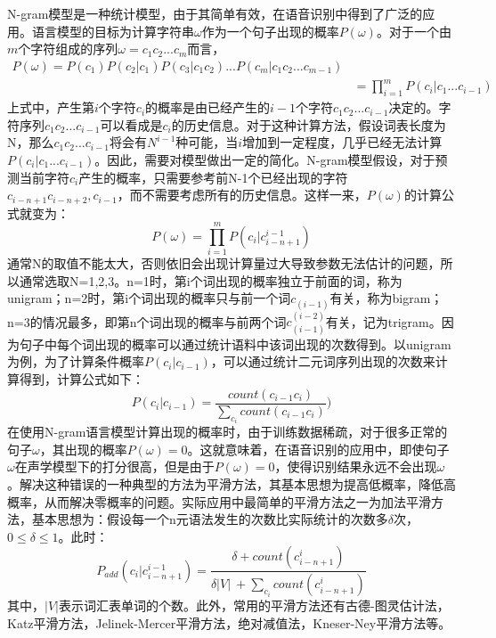 N-gram模型是一种统计模型，由于其简单有效，在语音识别中得到了广泛的应用。语言模型的目标为计算字符串$\omega$作为一个句子出现的概率$P(\omega)$。对于一个由$m$个字符组成的序列$\omega=c_1 c_2...c_m$而言，
\begin{eqnarray}
  P(\omega) = P(c_1)P(c_2|c_1)P(c_3|c_1 c_2)...P(c_m|c_1 c_2...c_{m-1}) \\
          & = \prod\limits_{i=1}^m P(c_i|c_1...c_{i-1})
\end{eqnarray}
上式中，产生第$i$个字符$c_i$的概率是由已经产生的$i-1$个字符$c_1 c_2...c_{i-1}$决定的。字符序列$c_1 c_2...c_{i-1}$可以看成是$c_i$的历史信息。对于这种计算方法，假设词表长度为N，那么$c_1 c_2...c_{i-1}$将会有$N^{i-1}$种可能，当$i$增加到一定程度，几乎已经无法计算$P(c_i|c_1...c_{i-1})$。因此，需要对模型做出一定的简化。N-gram模型假设，对于预测当前字符$c_i$产生的概率，只需要参考前N-1个已经出现的字符$c_{i-n+1} c_{i-n+2}, c_{i-1}$，而不需要考虑所有的历史信息。这样一来，$P(\omega)$的计算公式就变为：
\begin{equation}P(\omega) = \prod\limits_{i=1}^m P(c_i|c_{i-n+1}^{i-1})\end{equation}
通常N的取值不能太大，否则依旧会出现计算量过大导致参数无法估计的问题，所以通常选取N=1,2,3。n=1时，第i个词出现的概率独立于前面的词，称为unigram；n=2时，第i个词出现的概率只与前一个词$c_(i-1)$有关，称为bigram；n=3的情况最多，即第n个词出现的概率与前两个词$c_(i-1)^(i-2)$有关，记为trigram。因为句子中每个词出现的概率可以通过统计语料中该词出现的次数得到。以unigram为例，为了计算条件概率$P(c_i|c_{i-1})$，可以通过统计二元词序列出现的次数来计算得到，计算公式如下：
\begin{equation}P(c_i|c_{i-1})=\frac{count(c_{i-1} c_i)}{\sum\limits_{c_i} count(c_{i-1} c_i)})\end{equation}
在使用N-gram语言模型计算出现的概率时，由于训练数据稀疏，对于很多正常的句子$\omega$，其出现的概率$P(\omega)=0$。这就意味着，在语音识别的应用中，即使句子$\omega$在声学模型下的打分很高，但是由于$P(\omega)=0$，使得识别结果永远不会出现$\omega$。解决这种错误的一种典型的方法为平滑方法，其基本思想为提高低概率，降低高概率，从而解决零概率的问题。实际应用中最简单的平滑方法之一为加法平滑方法，基本思想为：假设每一个n元语法发生的次数比实际统计的次数多$\delta$次，$0\leqslant \delta \leqslant 1$。此时：
\begin{equation}P_{add}(c_i|c_{i-n+1}^{i-1})=\frac{\delta+count(c_{i-n+1}^{i})}{\delta \lvert V\rvert\ + \sum\limits_{c_i} count(c_{i-n+1}^i)}\end{equation}
其中，$\lvert V\rvert$表示词汇表单词的个数。此外，常用的平滑方法还有古德-图灵估计法，Katz平滑方法，Jelinek-Mercer平滑方法，绝对减值法，Kneser-Ney平滑方法等\cite{goodman2001bit}。
